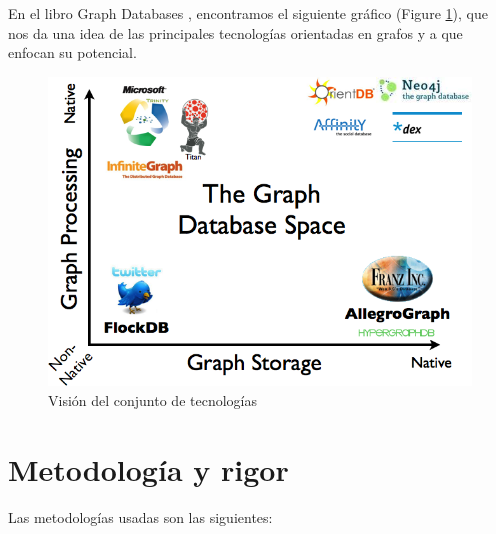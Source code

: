 \documentclass[12pt]{article} %
\begin{document}
En el libro Graph Databases \cite{graphdbbook}, encontramos el siguiente gráfico (Figure \ref{fig:grdb}), que nos da una idea de las principales tecnologías orientadas en grafos y a que enfocan su potencial.

\begin{figure}[ht!]
\center
\includegraphics{grdb.png}
\caption{Visión del conjunto de tecnologías}
\label{fig:grdb}
\end{figure}

\section{Metodología y rigor}

Las metodologías usadas son las siguientes:
\end{document}
